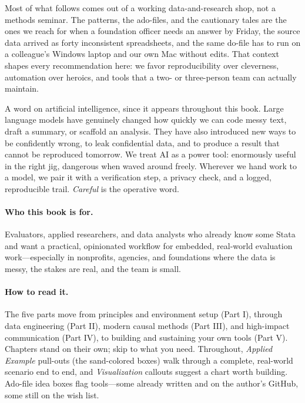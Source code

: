 \documentclass[
    a4paper,
    fontsize=10pt,
    twoside=true,
    numbers=noenddot,
]{kaobook}
\begin{document}
Most of what follows comes out of a working data-and-research shop, not a methods seminar. The patterns, the ado-files, and the cautionary tales are the ones we reach for when a foundation officer needs an answer by Friday, the source data arrived as forty inconsistent spreadsheets, and the same do-file has to run on a colleague's Windows laptop and our own Mac without edits. That context shapes every recommendation here: we favor reproducibility over cleverness, automation over heroics, and tools that a two- or three-person team can actually maintain.

A word on artificial intelligence, since it appears throughout this book. Large language models have genuinely changed how quickly we can code messy text, draft a summary, or scaffold an analysis. They have also introduced new ways to be confidently wrong, to leak confidential data, and to produce a result that cannot be reproduced tomorrow. We treat AI as a power tool: enormously useful in the right jig, dangerous when waved around freely. Wherever we hand work to a model, we pair it with a verification step, a privacy check, and a logged, reproducible trail. \emph{Careful} is the operative word.

\paragraph{Who this book is for.} Evaluators, applied researchers, and data analysts who already know some Stata and want a practical, opinionated workflow for embedded, real-world evaluation work---especially in nonprofits, agencies, and foundations where the data is messy, the stakes are real, and the team is small.

\paragraph{How to read it.} The five parts move from principles and environment setup (Part I), through data engineering (Part II), modern causal methods (Part III), and high-impact communication (Part IV), to building and sustaining your own tools (Part V). Chapters stand on their own; skip to what you need. Throughout, \emph{Applied Example} pull-outs (the sand-colored boxes) walk through a complete, real-world scenario end to end, and \emph{Visualization} callouts suggest a chart worth building. Ado-file idea boxes flag tools---some already written and on the author's GitHub, some still on the wish list.

\end{document}

